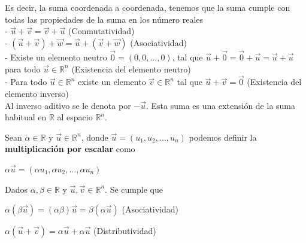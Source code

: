 \documentclass{article}
\theoremstyle{plain}
\theoremstyle{definition}
\begin{document}
Es decir, la suma coordenada a coordenada, tenemos que la suma cumple con todas las propiedades de la suma en los número reales   \\

- $\overrightarrow{u}+ \overrightarrow{v} = \overrightarrow{v}+ \overrightarrow{u}$  (Conmutatividad) \\

- $ (\overrightarrow{u}+ \overrightarrow{v}) + \overrightarrow{w}  = \overrightarrow{u}+ (\overrightarrow{v} +\overrightarrow{w})$ (Asociatividad) \\

- Existe un elemento neutro $\overrightarrow{0}=(0, 0, ... ,0)$, tal que $\overrightarrow{u}+ \overrightarrow{0} = \overrightarrow{0}+ \overrightarrow{u}= \overrightarrow{u}+ \overrightarrow{u}$ para todo $\overrightarrow{u} \in \mathbb{R}^n$ (Existencia del elemento neutro)\\

- Para todo $\overrightarrow{u} \in \mathbb{R}^n$ existe un elemento $\overrightarrow{v} \in \mathbb{R}^n$ tal que $\overrightarrow{u}+ \overrightarrow{v}= \overrightarrow{0}$	(Existencia del elemento inverso)\\

Al inverso aditivo se le denota por $-\overrightarrow{u}$. Esta suma es una extensión de la suma habitual en $\mathbb{R}$ al espacio $\mathbb{R}^n$. \\

\newpage


Sean $\alpha \in \mathbb{R}$ y $\overrightarrow{u} \in \mathbb{R}^n$, donde $\overrightarrow{u} =(u_1,u_2,... ,u_n)$ podemos definir la \textbf{multiplicación por escalar} como

\begin{center}
$\alpha\overrightarrow{u} = (\alpha u_1,\alpha u_2,... ,\alpha u_n)$
\end{center}

Dados $\alpha,\beta \in \mathbb{R}$ y $\overrightarrow{u},\overrightarrow{v} \in \mathbb{R}^n$. Se cumple que

\begin{center}
$\alpha(\beta \overrightarrow{u}) = (\alpha \beta)\overrightarrow{u} = \beta(\alpha \overrightarrow{u})$ (Asociatividad)
\end{center}

\begin{center}
$\alpha(\overrightarrow{u}+\overrightarrow{v})=\alpha\overrightarrow{u} + \alpha \overrightarrow{u}$ (Distributividad)
\end{center}
\end{document}
